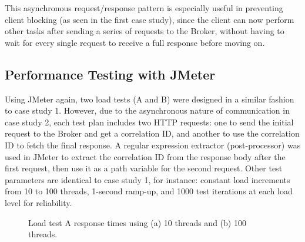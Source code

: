 This asynchronous request/response pattern is especially useful in preventing client blocking (as seen in the first case study), since the client can now perform other tasks after sending a series of requests to the Broker, without having to wait for every single request to receive a full response before moving on.


\subsection{Performance Testing with JMeter}

Using JMeter again, two load tests (A and B) were designed in a similar fashion to case study 1. However, due to the asynchronous nature of communication in case study 2, each test plan includes two HTTP requests: one to send the initial request to the Broker and get a correlation ID, and another to use the correlation ID to fetch the final response. A regular expression extractor (post-processor) was used in JMeter to extract the correlation ID from the response body after the first request, then use it as a path variable for the second request. Other test parameters are identical to case study 1, for instance: constant load increments from 10 to 100 threads, 1-second ramp-up, and 1000 test iterations at each load level for reliability.

\begin{figure}[H]
  \centering
  \caption{Load test A response times using (a) 10 threads and (b) 100 threads.}
  \label{fig:cs02-lta-12}
\end{figure}

